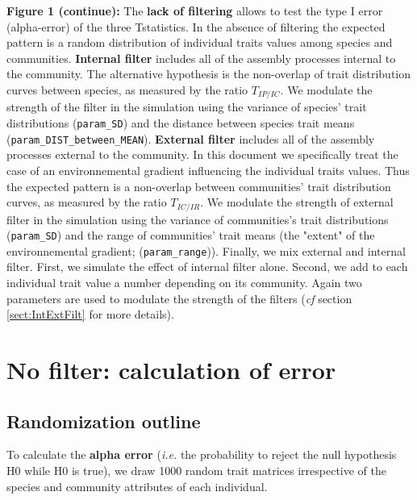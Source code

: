 \documentclass[12pt]{article}\usepackage[]{graphicx}\usepackage[]{color}
\begin{document}
\clearpage
\textbf{Figure 1 (continue):} The \textbf{lack of filtering} allows to test the type I error (alpha-error) of the three Tstatistics. In the absence of filtering the expected pattern is a random distribution of individual traits values among species and communities.
\textbf{Internal filter} includes all of the assembly processes internal to the community. The alternative hypothesis is the non-overlap of trait distribution curves between species, as measured by the ratio $T_{IP/IC}$. We modulate the strength of the filter in the simulation using the variance of species' trait distributions (\texttt{param\_{}SD}) and the distance between species trait means (\texttt{param\_{}DIST\_{}between\_{}MEAN}). 
\textbf{External filter} includes all of the assembly processes external to the community. In this document we specifically treat the case of an environnemental gradient influencing the individual traits values. Thus the expected pattern is a non-overlap between communities' trait distribution curves, as measured by the ratio $T_{IC/IR}$. We modulate the strength of external filter in the simulation using the variance of communities's trait distributions (\texttt{param\_{}SD}) and the range of communities' trait means (the "extent" of the environnemental gradient; (\texttt{param\_{}range})). 
Finally, we mix external and internal filter. First, we simulate the effect of internal filter alone. Second, we add to each individual trait value a number depending on its community. Again two parameters are used to modulate the strength of the filters (\textit{cf} section \ref{sect:IntExtFilt} for more details). 
\vspace*{1cm}


\cleardoublepage

\section{No filter: calculation of error}
 \subsection {Randomization outline}

To calculate the \textbf{alpha error} (\textit{i.e.} the probability to reject the null hypothesis H0 while H0 is true), we draw 1000 random trait matrices irrespective of the species and community attributes of each individual.
\end{document}
